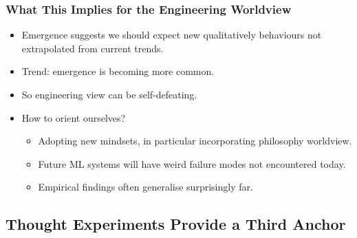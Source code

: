 \subsubsection{What This Implies for the Engineering Worldview}

\begin{itemize}
    \item Emergence suggests we should expect new qualitatively behaviours not extrapolated from current trends.
    \item Trend: emergence is becoming more common. 
    \item So engineering view can be self-defeating.
    \item How to orient ourselves?
    \begin{itemize}
        \item Adopting new mindsets, in particular incorporating philosophy worldview.
        \item Future ML systems will have weird failure modes not encountered today.
        \item Empirical findings often generalise surprisingly far.
    \end{itemize}
\end{itemize}


\subsection{Thought Experiments Provide a Third Anchor}

